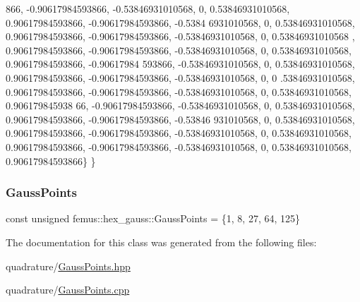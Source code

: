 \begin{DoxyCode}
      866, -0.90617984593866, -0.53846931010568, 0, 0.53846931010568, 0.90617984593866, -0.90617984593866, -0.5384
      6931010568, 0, 0.53846931010568, 0.90617984593866, -0.90617984593866, -0.53846931010568, 0, 0.53846931010568
      , 0.90617984593866, -0.90617984593866, -0.53846931010568, 0, 0.53846931010568, 0.90617984593866, -0.90617984
      593866, -0.53846931010568, 0, 0.53846931010568, 0.90617984593866, -0.90617984593866, -0.53846931010568, 0, 0
      .53846931010568, 0.90617984593866, -0.90617984593866, -0.53846931010568, 0, 0.53846931010568, 0.906179845938
      66, -0.90617984593866, -0.53846931010568, 0, 0.53846931010568, 0.90617984593866, -0.90617984593866, -0.53846
      931010568, 0, 0.53846931010568, 0.90617984593866, -0.90617984593866, -0.53846931010568, 0, 0.53846931010568,
       0.90617984593866, -0.90617984593866, -0.53846931010568, 0, 0.53846931010568, 0.90617984593866\}
  \}
\end{DoxyCode}
\mbox{\label{classfemus_1_1hex__gauss_a807f55d8c0d8d6b6c916930262cf41fb}} 
\subsubsection{\texorpdfstring{Gauss\+Points}{GaussPoints}}
{\footnotesize\ttfamily const unsigned femus\+::hex\+\_\+gauss\+::\+Gauss\+Points = \{1, 8, 27, 64, 125\}\hspace{0.3cm}{\ttfamily [static]}}



The documentation for this class was generated from the following files\+:\begin{DoxyCompactItemize}
\item 
quadrature/\mbox{\hyperlink{_gauss_points_8hpp}{Gauss\+Points.\+hpp}}\item 
quadrature/\mbox{\hyperlink{_gauss_points_8cpp}{Gauss\+Points.\+cpp}}\end{DoxyCompactItemize}
